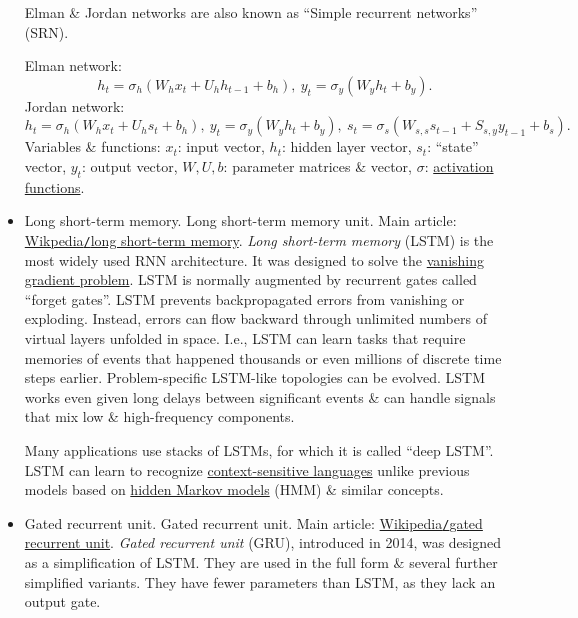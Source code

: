\documentclass{article}
\begin{document}
\begin{itemize}
	Elman \& Jordan networks are also known as ``Simple recurrent networks'' (SRN).
	
	Elman network:
	\begin{equation}
		\label{Elman network}
		\tag{Elman nw}
		h_t = \sigma_h(W_hx_t + U_hh_{t-1} + b_h),\ y_t = \sigma_y(W_yh_t + b_y).
	\end{equation}
	Jordan network:
	\begin{equation}
		\label{Jordan network}
		\tag{Jordan nw}
		h_t = \sigma_h(W_hx_t + U_hs_t + b_h),\ y_t = \sigma_y(W_yh_t + b_y),\ s_t = \sigma_s(W_{s,s}s_{t-1} + S_{s,y}y_{t-1} + b_s).
	\end{equation}
	Variables \& functions: $x_t$: input vector, $h_t$: hidden layer vector, $s_t$: ``state'' vector, $y_t$: output vector, $W,U,b$: parameter matrices \& vector, $\sigma$: \href{https://en.wikipedia.org/wiki/Activation_function}{activation functions}.
	\item {\sf Long short-term memory.} {\sf Long short-term memory unit.} Main article: \href{https://en.wikipedia.org/wiki/Long_short-term_memory}{Wikpedia{\tt/}long short-term memory}. {\it Long short-term memory} (LSTM) is the most widely used RNN architecture. It was designed to solve the \href{https://en.wikipedia.org/wiki/Vanishing_gradient_problem}{vanishing gradient problem}. LSTM is normally augmented by recurrent gates called ``forget gates''. LSTM prevents backpropagated errors from vanishing or exploding. Instead, errors can flow backward through unlimited numbers of virtual layers unfolded in space. I.e., LSTM can learn tasks that require memories of events that happened thousands or even millions of discrete time steps earlier. Problem-specific LSTM-like topologies can be evolved. LSTM works even given long delays between significant events \& can handle signals that mix low \& high-frequency components.
	
	Many applications use stacks of LSTMs, for which it is called ``deep LSTM''. LSTM can learn to recognize \href{https://en.wikipedia.org/wiki/Context-sensitive_languages}{context-sensitive languages} unlike previous models based on \href{https://en.wikipedia.org/wiki/Hidden_Markov_model}{hidden Markov models} (HMM) \& similar concepts.
	\item {\sf Gated recurrent unit.} {\sf Gated recurrent unit.} Main article: \href{https://en.wikipedia.org/wiki/Gated_recurrent_unit}{Wikipedia{\tt/}gated recurrent unit}. {\it Gated recurrent unit} (GRU), introduced in 2014, was designed as a simplification of LSTM. They are used in the full form \& several further simplified variants. They have fewer parameters than LSTM, as they lack an output gate.
	

\end{itemize}
\end{document}
